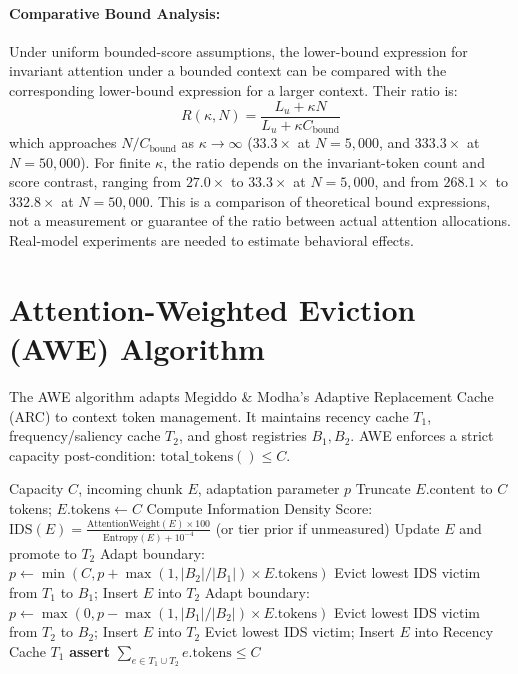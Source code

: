 \documentclass[11pt,a4paper]{article}
\begin{document}
\paragraph{Comparative Bound Analysis:} Under uniform bounded-score assumptions, the lower-bound expression for invariant attention under a bounded context can be compared with the corresponding lower-bound expression for a larger context. Their ratio is:
\begin{equation}
    R(\kappa, N) = \frac{L_u + \kappa N}{L_u + \kappa C_{\text{bound}}}
\end{equation}
which approaches $N / C_{\text{bound}}$ as $\kappa \to \infty$ ($33.3\times$ at $N = 5{,}000$, and $333.3\times$ at $N = 50{,}000$). For finite $\kappa$, the ratio depends on the invariant-token count and score contrast, ranging from $27.0\times$ to $33.3\times$ at $N = 5{,}000$, and from $268.1\times$ to $332.8\times$ at $N = 50{,}000$. This is a comparison of theoretical bound expressions, not a measurement or guarantee of the ratio between actual attention allocations. Real-model experiments are needed to estimate behavioral effects.

\section{Attention-Weighted Eviction (AWE) Algorithm}
\label{sec:awe}

The AWE algorithm adapts Megiddo \& Modha's Adaptive Replacement Cache (ARC) to context token management. It maintains recency cache $T_1$, frequency/saliency cache $T_2$, and ghost registries $B_1, B_2$. AWE enforces a strict capacity post-condition: $\text{total\_tokens}() \le C$.

\begin{algorithm}[H]
\caption{Attention-Weighted Eviction (AWE) with Hard Capacity Invariant}
\label{alg:awe}
\begin{algorithmic}[1]
\REQUIRE Capacity $C$, incoming chunk $E$, adaptation parameter $p$
    \STATE Truncate $E.\text{content}$ to $C$ tokens; $E.\text{tokens} \leftarrow C$
\ENDIF
\STATE Compute Information Density Score: $\text{IDS}(E) = \frac{\text{AttentionWeight}(E) \times 100}{\text{Entropy}(E) + 10^{-4}}$ (or tier prior if unmeasured)
    \STATE Update $E$ and promote to $T_2$
    \STATE Adapt boundary: $p \leftarrow \min(C, p + \max(1, |B_2|/|B_1|) \times E.\text{tokens})$
    \STATE Evict lowest IDS victim from $T_1$ to $B_1$; Insert $E$ into $T_2$
    \STATE Adapt boundary: $p \leftarrow \max(0, p - \max(1, |B_1|/|B_2|) \times E.\text{tokens})$
    \STATE Evict lowest IDS victim from $T_2$ to $B_2$; Insert $E$ into $T_2$
\ELSE
    \STATE Evict lowest IDS victim; Insert $E$ into Recency Cache $T_1$
\ENDIF
\STATE \textbf{assert} $\sum_{e \in T_1 \cup T_2} e.\text{tokens} \le C$
\end{algorithmic}
\end{algorithm}
\end{document}
